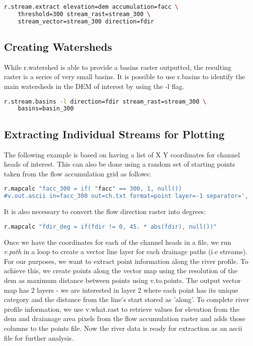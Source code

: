 \begin{lstlisting}[language=bash]
r.stream.extract elevation=dem accumulation=facc \
	threshold=300 stream_rast=stream_300 \
	stream_vector=stream_300 direction=fdir
\end{lstlisting}

\subsection{Creating Watersheds}

While r.watershed is able to provide a basins raster outputted, the resulting raster is a series of very small basins. It is possible to use r.basins to identify the main watersheds in the DEM of interest by using the -l flag. 

\begin{lstlisting}[language=bash]
r.stream.basins -l direction=fdir stream_rast=stream_300 \
	basins=basin_300
\end{lstlisting}


\subsection{Extracting Individual Streams for Plotting}

The following example is based on having a list of X Y coordinates for channel heads of interest. This can also be done using a random set of starting points taken from the flow accumulation grid as follows:

\begin{lstlisting}[language=bash]
r.mapcalc "facc_300 = if( "facc" == 300, 1, null())
#v.out.ascii in=facc_300 out=ch.txt format=point layer=-1 separator=',' --o
\end{lstlisting}

It is also necessary to convert the flow direction raster into degrees:

\begin{lstlisting}[language=bash]
r.mapcalc "fdir_deg = if(fdir != 0, 45. * abs(fdir), null())"
\end{lstlisting}

Once we have the coordinates for each of the channel heads in a file, we run \textit{r.path} in a loop to create a vector line layer for each drainage paths (i.e streams). For our purposes, we want to extract point information along the river profile. To achieve this, we create points along the vector map using the resolution of the dem as maximum distance between points using v.to.points. The output vector map has 2 layers - we are interested in layer 2 where each point has its unique category and the distance from the line's start stored as 'along'. To complete river profile information, we use v.what.rast to retrieve values for elevation from the dem and draianage area pixels from the flow accumulation raster and adds those columns to the points file. Now the river data is ready for extraction as an ascii file for further analysis. 

